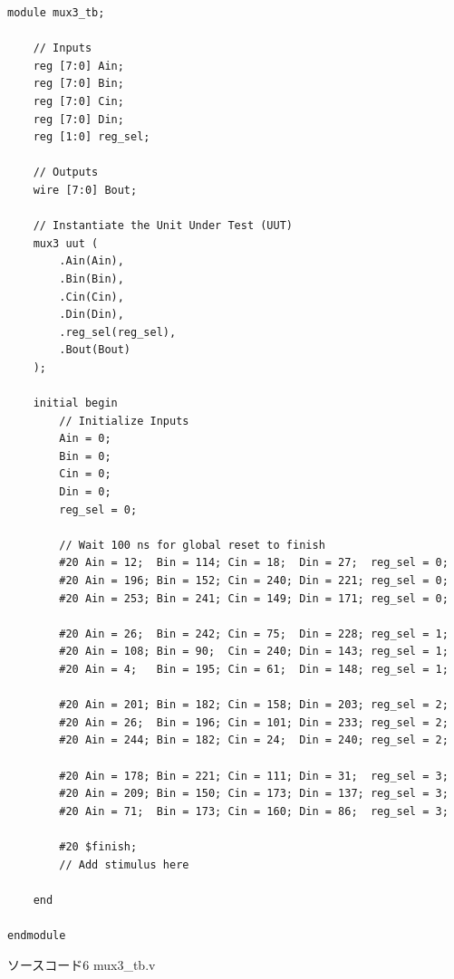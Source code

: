 \documentclass[12pt]{jreport}
\begin{document}
        \begin{center}
            \begin{lstlisting}[basicstyle=\ttfamily\footnotesize, frame=single]
module mux3_tb;

    // Inputs
    reg [7:0] Ain;
    reg [7:0] Bin;
    reg [7:0] Cin;
    reg [7:0] Din;
    reg [1:0] reg_sel;

    // Outputs
    wire [7:0] Bout;

    // Instantiate the Unit Under Test (UUT)
    mux3 uut (
        .Ain(Ain), 
        .Bin(Bin), 
        .Cin(Cin), 
        .Din(Din), 
        .reg_sel(reg_sel), 
        .Bout(Bout)
    );

    initial begin
        // Initialize Inputs
        Ain = 0;
        Bin = 0;
        Cin = 0;
        Din = 0;
        reg_sel = 0;

        // Wait 100 ns for global reset to finish
        #20 Ain = 12;  Bin = 114; Cin = 18;  Din = 27;  reg_sel = 0;
        #20 Ain = 196; Bin = 152; Cin = 240; Din = 221; reg_sel = 0;
        #20 Ain = 253; Bin = 241; Cin = 149; Din = 171; reg_sel = 0;

        #20 Ain = 26;  Bin = 242; Cin = 75;  Din = 228; reg_sel = 1;
        #20 Ain = 108; Bin = 90;  Cin = 240; Din = 143; reg_sel = 1;
        #20 Ain = 4;   Bin = 195; Cin = 61;  Din = 148; reg_sel = 1;

        #20 Ain = 201; Bin = 182; Cin = 158; Din = 203; reg_sel = 2;
        #20 Ain = 26;  Bin = 196; Cin = 101; Din = 233; reg_sel = 2;
        #20 Ain = 244; Bin = 182; Cin = 24;  Din = 240; reg_sel = 2;

        #20 Ain = 178; Bin = 221; Cin = 111; Din = 31;  reg_sel = 3;
        #20 Ain = 209; Bin = 150; Cin = 173; Din = 137; reg_sel = 3;
        #20 Ain = 71;  Bin = 173; Cin = 160; Din = 86;  reg_sel = 3;
      
        #20 $finish;
        // Add stimulus here

    end
      
endmodule
            \end{lstlisting}
            ソースコード6 mux3\_tb.v
        \end{center}
        \newpage
\end{document}
